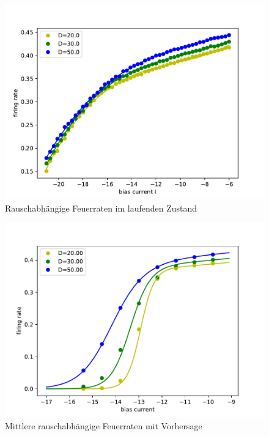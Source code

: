 \documentclass[12pt,a4paper]{article}
\begin{document}
\begin{figure}[H]
	\centering
	\includegraphics[scale=1]{detmocountrinzelcomp2.pdf}\caption{Rauschabhängige Feuerraten im laufenden Zustand}
	\label{detrinzelrate}
\end{figure}
\begin{figure}[H]
	\centering
	\includegraphics[scale=1]{gcomprate3nolog.pdf}\caption{Mittlere rauschabhängige Feuerraten mit Vorhersage}
	\label{rinzelrate}
\end{figure}
\end{document}
